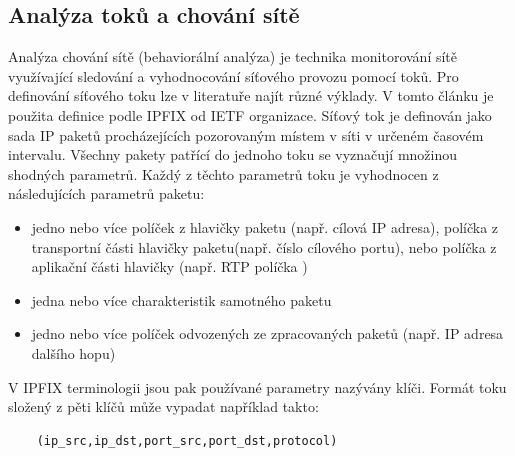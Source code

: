 \documentclass[thesis=M,czech]{FITthesis}[2012/06/26]
\begin{document}
\subsection{Analýza toků a chování sítě}
Analýza chování sítě (behaviorální analýza) je technika monitorování sítě využívající sledování a vyhodnocování síťového provozu pomocí toků. Pro definování síťového toku lze v literatuře najít různé výklady. V tomto článku je použita definice podle IPFIX od IETF organizace.\cite{ipfix} Síťový tok je definován jako sada IP paketů procházejících pozorovaným místem v síti v určeném časovém intervalu. Všechny pakety patřící do jednoho toku se vyznačují množinou shodných parametrů. Každý z těchto parametrů toku je vyhodnocen z následujících parametrů paketu:
\begin{itemize}
	\item jedno nebo více políček z hlavičky paketu (např. cílová IP adresa), políčka z transportní části hlavičky paketu(např. číslo cílového portu), nebo políčka z aplikační části hlavičky (např. RTP políčka \cite{rtp})
	\item jedna nebo více charakteristik samotného paketu
	\item jedno nebo více políček odvozených ze zpracovaných paketů (např. IP adresa dalšího hopu)
\end{itemize}
V IPFIX terminologii jsou pak používané parametry nazývány klíči. Formát toku složený z pěti klíčů může vypadat například takto:
\begin{verbatim}
	(ip_src,ip_dst,port_src,port_dst,protocol)
\end{verbatim}
\end{document}
